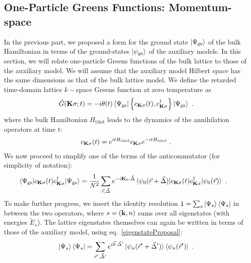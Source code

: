 \documentclass[reprint,hidelinks,onecolumn]{revtex4-2}
\begin{document}
\subsection{One-Particle Greens Functions: Momentum-space}
In the previous part, we proposed a form for the ground state \(\ket{\Psi_\text{gs}}\) of the bulk Hamiltonian in terms of the ground-states \(\ket{\psi_\text{gs}}\) of the auxiliary models.
In this section, we will relate one-particle Greens functions of the bulk lattice to those of the auxiliary model. We will assume that the auxiliary model Hilbert space has the same dimensions as that of the bulk lattice model. We define the retarded time-domain lattice \(k-\)space Greens function at zero temperature as
\begin{equation}\begin{aligned}
	\tilde G({\bf K}\sigma; t) = -i\theta(t) \braket{\Psi_\text{gs} | \left\{ c_{{\bf K}\sigma}(t), c^\dagger_{{\bf K}\sigma} \right\} | \Psi_\text{gs}}~.
\end{aligned}\end{equation}
where the bulk Hamiltonian \(H_\text{tiled}\) leads to the dynamics of the annihilation operators at time \(t\): 
\begin{equation}\begin{aligned}\label{heisenberg}
	c_{{\bf K}\sigma}(t) = e^{it H_\text{tiled} }c_{{\bf K}\sigma}e^{-i t H_\text{tiled}}~.
\end{aligned}\end{equation}
We now proceed to simplify one of the terms of the anticommutator (for simplicity of notation):
\begin{equation}\begin{aligned}\label{greensFunction1}
	&\braket{\Psi_\text{gs} | c_{{\bf K}\sigma}(t) c^\dagger_{{\bf K}\sigma} | \Psi_\text{gs}} = \frac{1}{N^2}\sum_{\vec r,\vec \Delta}e^{-i{\bf K}_0\cdot\vec\Delta}\braket{\psi_{0}(\vec r+\vec \Delta) | c_{{\bf K}\sigma}(t) c^\dagger_{{\bf K}\sigma} | \psi_{0}(\vec r)}~.
\end{aligned}\end{equation}
To make further progress, we insert the identity resolution \(1 = \sum_s\ket{\Psi_s}\bra{\Psi_s}\) in between the two operators, where \(s=\left({\bf k}, n\right)\) sums over all eigenstates (with energies \(\tilde E_s\)). The lattice eigenstates themselves can again be written in terms of those of the auxiliary model, using eq.~\ref{eigenstateProposal}:
\begin{equation}\begin{aligned}
	\ket{\Psi_s}\bra{\Psi_s} = \sum_{\vec r^\prime,\vec \Delta^\prime} e^{i\vec k\cdot\vec\Delta^\prime}\ket{\psi_n(\vec r^\prime+\vec \Delta^\prime)}\bra{\psi_n(\vec r^\prime)}~.
\end{aligned}\end{equation}
\end{document}
